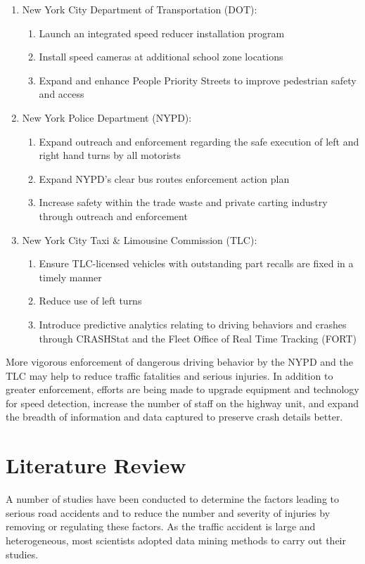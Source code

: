 \documentclass[conference]{IEEEtran}
\begin{document}
\begin{enumerate}  
	\item New York City Department of Transportation (DOT):
	\begin{enumerate}
		\item Launch an integrated speed reducer installation program
		\item Install speed cameras at additional school zone locations
		\item Expand and enhance People Priority Streets to improve pedestrian safety and access
	\end{enumerate}  
	\item New York Police Department (NYPD):
	\begin{enumerate}
		\item Expand outreach and enforcement regarding the safe execution of left and right hand turns by all motorists
		\item Expand NYPD's clear bus routes enforcement action plan
		\item Increase safety within the trade waste and private carting industry through outreach and enforcement   
	\end{enumerate}
	\item New York City Taxi \& Limousine Commission (TLC):
	\begin{enumerate}
		\item Ensure TLC-licensed vehicles with outstanding part recalls are fixed in a timely manner
		\item Reduce use of left turns
		\item Introduce predictive analytics relating to driving behaviors and crashes through CRASHStat and the Fleet Office of Real Time Tracking (FORT)
	\end{enumerate}
\end{enumerate}

More vigorous enforcement of dangerous driving behavior by the NYPD and the TLC may help to reduce traffic fatalities and serious injuries. In addition to greater enforcement, efforts are being made to upgrade equipment and technology for speed detection, increase the number of staff on the highway unit, and expand the breadth of information and data captured to preserve crash details better.
\section{Literature Review}
A number of studies have been conducted to determine the factors leading to serious road accidents and to reduce the number and severity of injuries by removing or regulating these factors. As the traffic accident is large and heterogeneous, most scientists adopted data mining methods to carry out their studies.
\end{document}
